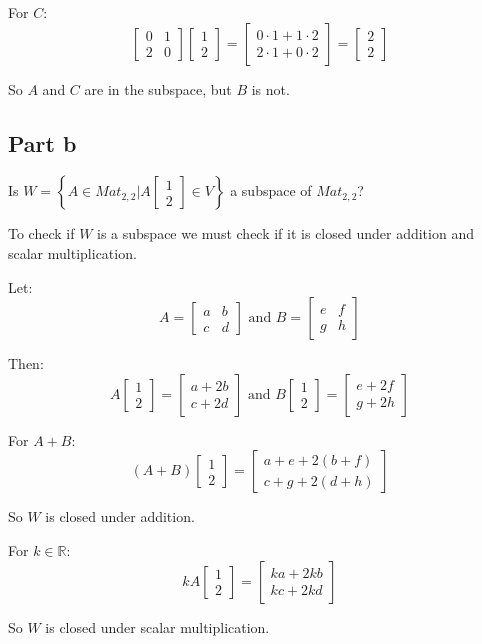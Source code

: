 For $C$:
\[
	\begin{bmatrix}
		0 & 1 \\
		2 & 0
	\end{bmatrix}\begin{bmatrix}
		1 \\
		2
	\end{bmatrix} =
	\begin{bmatrix}
		0\cdot 1 + 1\cdot 2 \\
		2\cdot 1 + 0\cdot 2
	\end{bmatrix} =
	\begin{bmatrix}
		2 \\
		2
	\end{bmatrix}
\]

So $A$ and $C$ are in the subspace, but $B$ is not.

\subsection{Part b}
Is $W = \left\{A\in Mat_{2,2} | A\begin{bmatrix}1\\2\end{bmatrix}\in V\right\}$ a subspace of $Mat_{2,2}$?

To check if $W$ is a subspace we must check if it is closed under addition and scalar multiplication.

Let:
\[
	A = \begin{bmatrix}
		a & b \\
		c & d
	\end{bmatrix} \text{ and }
	B = \begin{bmatrix}
		e & f \\
		g & h
	\end{bmatrix}
\]

Then:
\[
	A\begin{bmatrix}
		1 \\
		2
	\end{bmatrix} = \begin{bmatrix}
		a + 2b \\
		c + 2d
	\end{bmatrix} \text{ and }
	B\begin{bmatrix}
		1 \\
		2
	\end{bmatrix} = \begin{bmatrix}
		e + 2f \\
		g + 2h
	\end{bmatrix}
\]

For $A+B$:
\[
	(A+B)\begin{bmatrix}
		1 \\
		2
	\end{bmatrix} = \begin{bmatrix}
		a+e + 2(b+f) \\
		c+g + 2(d+h)
	\end{bmatrix}
\]

So $W$ is closed under addition.

For $k\in \mathbb{R}$:
\[
	kA\begin{bmatrix}
		1 \\
		2
	\end{bmatrix} = \begin{bmatrix}
		ka + 2kb \\
		kc + 2kd
	\end{bmatrix}
\]

So $W$ is closed under scalar multiplication.
